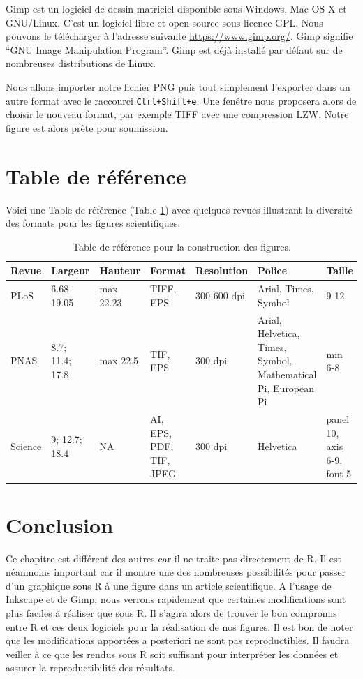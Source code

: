 \documentclass[
]{book}
\begin{document}
Gimp est un logiciel de dessin matriciel disponible sous Windows, Mac OS X et GNU/Linux. C'est un logiciel libre et open source sous licence GPL. Nous pouvons le télécharger à l'adresse suivante \url{https://www.gimp.org/}. Gimp signifie ``GNU Image Manipulation Program''. Gimp est déjà installé par défaut sur de nombreuses distributions de Linux.

Nous allons importer notre fichier PNG puis tout simplement l'exporter dans un autre format avec le raccourci \texttt{Ctrl+Shift+e}. Une fenêtre nous proposera alors de choisir le nouveau format, par exemple TIFF avec une compression LZW. Notre figure est alors prête pour soumission.

\hypertarget{table-de-ruxe9fuxe9rence}{%
\section{Table de référence}\label{table-de-ruxe9fuxe9rence}}

Voici une Table de référence (Table \ref{tab:tabRefPub}) avec quelques revues illustrant la diversité des formats pour les figures scientifiques.

\begin{table}

\caption{\label{tab:tabRefPub}Table de référence pour la construction des figures.\label{tab:tabRefPub}}
\centering
\begin{tabular}[t]{l|l|l|l|l|l|l}
\hline
Revue & Largeur & Hauteur & Format & Resolution & Police & Taille\\
\hline
PLoS & 6.68-19.05 & max 22.23 & TIFF, EPS & 300-600 dpi & Arial, Times, Symbol & 9-12\\
\hline
PNAS & 8.7; 11.4; 17.8 & max 22.5 & TIF, EPS & 300 dpi & Arial, Helvetica, Times, Symbol, Mathematical Pi, European Pi & min 6-8\\
\hline
Science & 9; 12.7; 18.4 & NA & AI, EPS, PDF, TIF, JPEG & 300 dpi & Helvetica & panel 10, axis 6-9, font 5\\
\hline
\end{tabular}
\end{table}

\hypertarget{conclusion-11}{%
\section{Conclusion}\label{conclusion-11}}

Ce chapitre est différent des autres car il ne traite pas directement de R. Il est néanmoins important car il montre une des nombreuses possibilités pour passer d'un graphique sous R à une figure dans un article scientifique. A l'usage de Inkscape et de Gimp, nous verrons rapidement que certaines modifications sont plus faciles à réaliser que sous R. Il s'agira alors de trouver le bon compromis entre R et ces deux logiciels pour la réalisation de nos figures. Il est bon de noter que les modifications apportées a posteriori ne sont pas reproductibles. Il faudra veiller à ce que les rendus sous R soit suffisant pour interpréter les données et assurer la reproductibilité des résultats.
\end{document}
